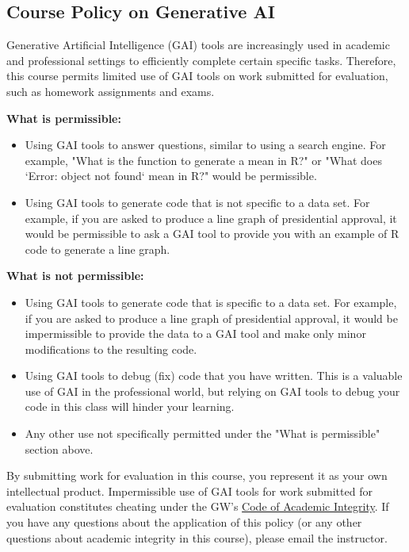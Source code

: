 \documentclass[12pt,letterpaper]{article}
\begin{document}
\subsection*{Course Policy on Generative AI}

Generative Artificial Intelligence (GAI) tools are increasingly used in academic and professional settings to efficiently complete certain specific tasks. Therefore, this course permits limited use of GAI tools on work submitted for evaluation, such as homework assignments and exams.

\textbf{What is permissible:}

\begin{itemize}
    \item Using GAI tools to answer questions, similar to using a search engine. For example, "What is the function to generate a mean in R?" or "What does `Error: object not found` mean in R?" would be permissible.
    \item Using GAI tools to generate code that is not specific to a data set. For example, if you are asked to produce a line graph of presidential approval, it would be permissible to ask a GAI tool to provide you with an example of R code to generate a line graph.
\end{itemize}

\textbf{What is not permissible:}

\begin{itemize}
    \item Using GAI tools to generate code that is specific to a data set. For example, if you are asked to produce a line graph of presidential approval, it would be impermissible to provide the data to a GAI tool and make only minor modifications to the resulting code.
    \item Using GAI tools to debug (fix) code that you have written. This is a valuable use of GAI in the professional world, but relying on GAI tools to debug your code in this class will hinder your learning.
    \item Any other use not specifically permitted under the "What is permissible" section above.
\end{itemize}

By submitting work for evaluation in this course, you represent it as your own intellectual product. Impermissible use of GAI tools for work submitted for evaluation constitutes cheating under the GW's \href{https://students.gwu.edu/code-academic-integrity}{Code of Academic Integrity}. If you have any questions about the application of this policy (or any other questions about academic integrity in this course), please email the instructor.
\end{document}
